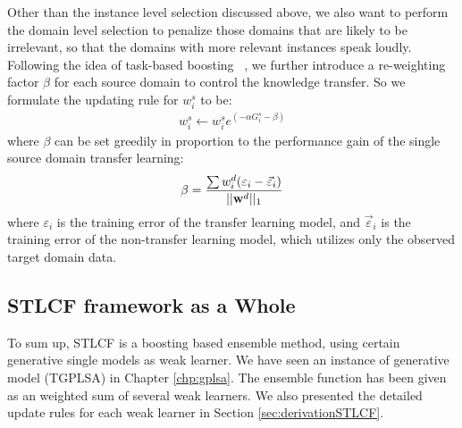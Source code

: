 Other than the instance level selection discussed above, we also want to perform the domain level selection to penalize those domains that are likely to be irrelevant, so that the domains with more relevant instances speak loudly.
Following the idea of task-based boosting ~\cite{/aaai/Eatond11}, we further introduce a re-weighting factor $\beta$ for each source domain to control the knowledge transfer. So we formulate the updating rule for $w_i^s$ to be:
\begin{eqnarray}\label{eq:wi_s}
    w_i^s \leftarrow w_i^s e^{(-\alpha G_i^s-\beta)}
\end{eqnarray}
where $\beta$ can be set greedily in proportion to the performance gain of the single source domain transfer learning:
\begin{eqnarray}\label{eq:beta}
    \beta = \frac{\sum w^d_i (\varepsilon_i - \vec{\varepsilon}_i)}{||\mathbf{w}^d||_1}
\end{eqnarray}
where $\varepsilon_i$ is the training error of the transfer learning model, and $\vec{\varepsilon}_i$ is the training error of the non-transfer learning model, which utilizes only the observed target domain data. 

\subsection{STLCF framework as a Whole}
To sum up, STLCF is a boosting based ensemble method, using certain generative single models as weak learner. We have seen an instance of generative model (TGPLSA) in Chapter \ref{chp:gplsa}. The ensemble function has been given as an weighted sum of several weak learners. We also presented the detailed update rules for each weak learner in Section \ref{sec:derivationSTLCF}.
